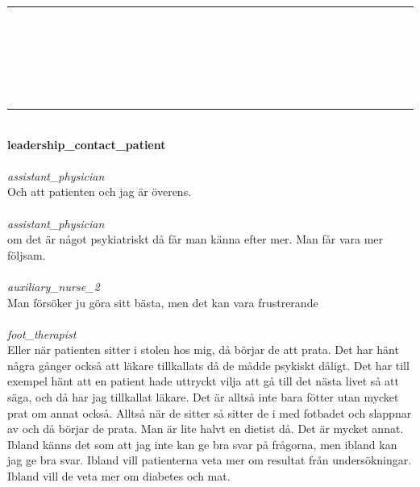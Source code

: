 \documentclass[12pt,a4paper,oneside]{article}
\begin{document}
\date{}
\maketitle
\vspace{-0.9cm}
\hrule
\ \\\ \\
{}\\
{}\\
\selectfont
\ \vspace{.66em}\\
\hrule
\ \vspace{.33em}\\
{\bf leadership\_contact\_patient }
\\\ \\%
 { \it  assistant\_physician %
}\\
Och att patienten och jag {\"a}r {\"o}verens. %
\ \\\ \\
 { \it   assistant\_physician %
}\\
om det {\"a}r n{\aa}got psykiatriskt d{\aa} f{\aa}r man k{\"a}nna efter mer. Man f{\aa}r vara mer f{\"o}ljsam. %
\ \\\ \\
 { \it   auxiliary\_nurse\_2 %
}\\
Man f{\"o}rs{\"o}ker ju g{\"o}ra sitt b{\"a}sta, men det kan vara frustrerande %
\ \\\ \\
 { \it   foot\_therapist %
}\\
Eller n{\"a}r patienten sitter i stolen hos mig, d{\aa} b{\"o}rjar de att prata. Det har h{\"a}nt n{\aa}gra g{\aa}nger ocks{\aa} att l{\"a}kare tillkallats d{\aa} de m{\aa}dde psykiskt d{\aa}ligt. Det har till exempel h{\"a}nt att en patient hade uttryckt vilja att g{\aa} till det n{\"a}sta livet s{\aa} att s{\"a}ga, och d{\aa} har jag tillkallat l{\"a}kare. Det {\"a}r allts{\aa} inte bara f{\"o}tter utan mycket prat om annat ocks{\aa}. Allts{\aa} n{\"a}r de sitter s{\aa} sitter de i med fotbadet och slappnar av och d{\aa} b{\"o}rjar de prata. Man {\"a}r lite halvt en dietist d{\aa}. Det {\"a}r mycket annat. Ibland k{\"a}nns det som att jag inte kan ge bra svar p{\aa} fr{\aa}gorna, men ibland kan jag ge bra svar. Ibland vill patienterna veta mer om resultat fr{\aa}n unders{\"o}kningar. Ibland vill de veta mer om diabetes och mat.  %
\end{document}

